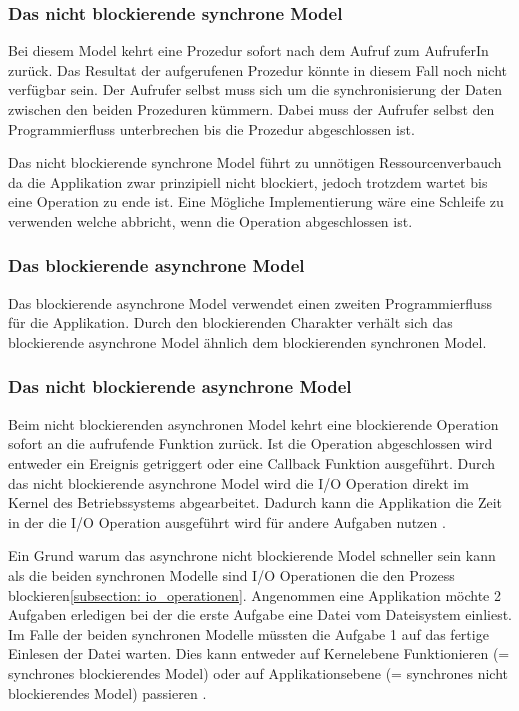 \subsubsection{Das nicht blockierende synchrone Model}

Bei diesem Model kehrt eine Prozedur sofort nach dem Aufruf zum AufruferIn zurück. Das Resultat der aufgerufenen Prozedur könnte in diesem Fall noch nicht verfügbar sein. Der Aufrufer selbst muss sich um die synchronisierung der Daten zwischen den beiden Prozeduren kümmern. Dabei muss der Aufrufer selbst den Programmierfluss unterbrechen bis die Prozedur abgeschlossen ist. 

Das nicht blockierende synchrone Model führt zu unnötigen Ressourcenverbauch da die Applikation zwar prinzipiell nicht blockiert, jedoch trotzdem wartet bis eine Operation zu ende ist. Eine Mögliche Implementierung wäre eine Schleife zu verwenden welche abbricht, wenn die Operation abgeschlossen ist.\cite[p. 48]{Erb2012}

\subsubsection{Das blockierende asynchrone Model}

Das blockierende asynchrone Model verwendet einen zweiten Programmierfluss für die Applikation. Durch den blockierenden Charakter verhält sich das blockierende asynchrone Model ähnlich dem blockierenden synchronen Model. 

\subsubsection{Das nicht blockierende asynchrone Model}
Beim nicht blockierenden asynchronen Model kehrt eine blockierende Operation sofort an die aufrufende Funktion zurück. Ist die Operation abgeschlossen wird entweder ein Ereignis getriggert oder eine Callback Funktion ausgeführt. Durch das nicht blockierende asynchrone Model wird die I/O Operation direkt im Kernel des Betriebssystems abgearbeitet. Dadurch kann die Applikation die Zeit in der die I/O Operation ausgeführt wird für andere Aufgaben nutzen \cite[p. 48]{Erb2012}.

Ein Grund warum das asynchrone nicht blockierende Model schneller sein kann als die beiden synchronen Modelle sind I/O Operationen die den Prozess blockieren\ref{subsection: io_operationen}. Angenommen eine Applikation möchte 2 Aufgaben erledigen bei der die erste Aufgabe eine Datei vom Dateisystem einliest. Im Falle der beiden synchronen Modelle müssten die Aufgabe 1 auf das fertige Einlesen der Datei warten. Dies kann entweder auf Kernelebene Funktionieren (= synchrones blockierendes Model) oder auf Applikationsebene (= synchrones nicht blockierendes Model) passieren \cite[]{Pet2015}. 


